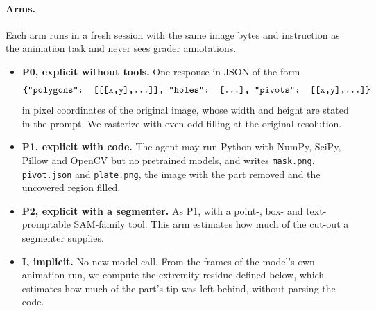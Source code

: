 \paragraph{Arms.} Each arm runs in a fresh session with the same image bytes and instruction as the animation task and never sees grader annotations.
\begin{itemize}
\item \textbf{P0, explicit without tools.} One response in JSON of the form
\[\texttt{\{"polygons": [[[x,y],\dots]], "holes": [\dots], "pivots": [[x,y],\dots]\}}\]
in pixel coordinates of the original image, whose width and height are stated in the prompt. We rasterize with even-odd filling at the original resolution.
\item \textbf{P1, explicit with code.} The agent may run Python with NumPy, SciPy, Pillow and OpenCV but no pretrained models, and writes \texttt{mask.png}, \texttt{pivot.json} and \texttt{plate.png}, the image with the part removed and the uncovered region filled.
\item \textbf{P2, explicit with a segmenter.} As P1, with a point-, box- and text-promptable SAM-family tool. This arm estimates how much of the cut-out a segmenter supplies.
\item \textbf{I, implicit.} No new model call. From the frames of the model's own animation run, we compute the extremity residue defined below, which estimates how much of the part's tip was left behind, without parsing the code.
\end{itemize}

